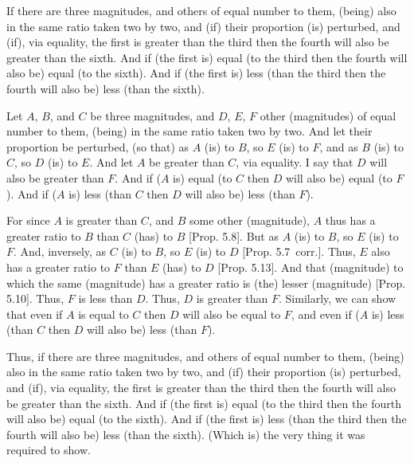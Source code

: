 \begin{Parallel}{}{}
{If there are three magnitudes, and others of equal
 number to them, (being) also in the same ratio taken two by two, and (if)
their proportion (is) perturbed, and (if), via equality,
the first is greater than the third then the fourth will also
be greater than the sixth. And if (the first is) equal (to the third then the
fourth will also be) equal (to the sixth).
And if (the first is) less (than the third then the fourth will also be) less (than
the sixth).

\epsfysize=0.7in
\centerline{}

Let $A$, $B$, and $C$ be three magnitudes, and $D$, $E$, $F$ other (magnitudes)
of equal number to them, (being) in the same ratio taken two by two. And let their proportion be perturbed, (so that) as $A$ (is) to $B$, so $E$ (is) to $F$, and as
$B$ (is) to $C$, so $D$ (is) to $E$. And let $A$  be greater than $C$, via equality. I
say that $D$ will also be greater than $F$.
 And if ($A$ is) equal (to $C$ then $D$ will also be) equal (to $F$). And
if ($A$ is) less (than $C$ then $D$ will also be) less (than $F$).

For since $A$ is greater than $C$, and $B$ some other (magnitude),  $A$ thus
has a greater ratio to $B$ than $C$ (has) to $B$ [Prop. 5.8]. But as $A$ (is) to $B$,
so $E$ (is) to $F$. And, inversely, as $C$ (is) to $B$, so $E$ (is) to $D$ [Prop. 5.7~corr.]. Thus, $E$ also has a greater
ratio to $F$ than $E$ (has) to $D$ [Prop. 5.13]. And that (magnitude) to which the same (magnitude)  has a greater ratio  is (the) lesser (magnitude) [Prop. 5.10].
Thus, $F$ is less than $D$. Thus, $D$ is greater than $F$. Similarly, we can show that
even if $A$ is equal to $C$ then $D$ will also
be equal to $F$, and even if ($A$ is) less (than $C$ then $D$ will also
be) less (than $F$).

Thus, if there are three magnitudes, and others of equal
 number to them, (being) also in the same ratio taken two by two, and (if)
their proportion (is) perturbed, and (if), via equality,
the first is greater than the third then the fourth will also
be greater than the sixth. And if (the first is) equal (to the third then the fourth
will also be) equal (to the sixth).
And if (the first is) less (than the third then the fourth will also be) less (than
the sixth). (Which is) the very thing it was required to show.}
\end{Parallel}


\vspace{7pt}{\footnotesize \noindent$^\dag$ In modern notation, this proposition
reads that if $\alpha:\beta::\epsilon:\zeta$ and $\beta:\gamma::\delta:\epsilon$ then $\alpha\gtreqqless\gamma$ as $\delta\gtreqqless\zeta$.}

